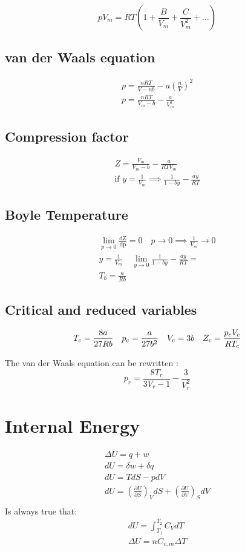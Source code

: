 \documentclass[Master.tex]{subfiles}
\begin{document}
\begin{multicols}{2}
				   \[
						    pV_{m}=RT\left( 1+\frac{B}{V_{m}}+\frac{C}{V^{2}_{m}}+\dots \right)
				   \]

		  \subsection{van der Waals equation}
				   \begin{gather*}
						    p = \frac{nRT}{V-nb} - a \left(\frac{n}{V} \right) ^{2}  \\
						    p = \frac{nRT}{V_{m} - b } - \frac{a}{V_{m}^2}
				   \end{gather*}
		  \subsection{Compression factor}
				   \begin{gather*}
						    Z = \frac{V_{m}}{V_{m}-b} - \frac{a}{RTV_{m}} \\
						    \text{if } y = \frac{1}{V_{m} } \implies \frac{1}{1-by} - \frac{ay}{RT}
				   \end{gather*}
		  \subsection{Boyle Temperature}
				   \begin{gather*}
						    \lim_{p \to 0}  \frac{\mathrm{dZ}}{\mathrm{dp}} = 0 \quad p \to 0 \implies \frac{1}{V_{m}} \to 0 \\
						    y =\frac{1}{V_{m} }\quad  \lim_{y \to 0} \frac{1}{1-by} - \frac{ay}{RT} = \\
						    T_{b} = \frac{a}{Rb}
				   \end{gather*}
		  \subsection{Critical and reduced variables}
				   \[
						    T_{c} = \frac{8a}{27Rb} \quad p_{c} = \frac{a}{27b^{2} } \quad V_{c} = 3b \quad Z_{c} = \frac{p_{c} V_{c}}{RT_{c}} \\
				   \]

				   The van der Waals equation can be rewritten :
				   \[
						    p_{r} = \frac{8T_{r} }{3V_{r} - 1 } - \frac{3}{V^{2} _{r} }
				   \]

		 \section{Internal Energy}
		  \begin{gather*}
				   \Delta U = q + w\\
				   dU = \delta w + \delta q \\
				   dU = TdS - pdV \\
				   dU = \left( \frac{\partial U}{\partial S}\right)_{V}dS + \left( \frac{\partial U}{\partial V} \right)_{S} dV \\
		  \end{gather*}
		  Is always true that:
		  \begin{gather*}
				   dU = \int_{T_1}^{T_2} C_{V}dT  \\
				   \Delta U = nC_{v,m}\Delta T
		  \end{gather*}


\end{multicols}
\end{document}
